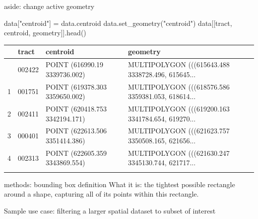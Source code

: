 \documentclass[
  ignorenonframetext,
]{beamer}
\newenvironment{Shaded}{\begin{snugshade}}{\end{snugshade}}
\newcommand{\NormalTok}[1]{\textcolor[rgb]{0.00,0.23,0.31}{#1}}
\newcommand{\OperatorTok}[1]{\textcolor[rgb]{0.37,0.37,0.37}{#1}}
\newcommand{\StringTok}[1]{\textcolor[rgb]{0.13,0.47,0.30}{#1}}
\begin{document}
\begin{frame}[fragile]{aside: change active geometry}
\label{aside-change-active-geometry}
\scriptsize

\begin{Shaded}
\begin{Highlighting}[]
\NormalTok{data[}\StringTok{"centroid"}\NormalTok{] }\OperatorTok{=}\NormalTok{ data.centroid}
\NormalTok{data.set\_geometry(}\StringTok{"centroid"}\NormalTok{)}
\NormalTok{data[[}\StringTok{\textquotesingle{}tract\textquotesingle{}}\NormalTok{, }\StringTok{\textquotesingle{}centroid\textquotesingle{}}\NormalTok{, }\StringTok{\textquotesingle{}geometry\textquotesingle{}}\NormalTok{]].head()}
\end{Highlighting}
\end{Shaded}

\begin{longtable}[]{@{}llll@{}}
\toprule\noalign{}
& tract & centroid & geometry \\
\midrule\noalign{}
\endhead
0 & 002422 & POINT (616990.19 3339736.002) & MULTIPOLYGON (((615643.488
3338728.496, 615645... \\
1 & 001751 & POINT (619378.303 3359650.002) & MULTIPOLYGON (((618576.586
3359381.053, 618614... \\
2 & 002411 & POINT (620418.753 3342194.171) & MULTIPOLYGON (((619200.163
3341784.654, 619270... \\
3 & 000401 & POINT (622613.506 3351414.386) & MULTIPOLYGON (((621623.757
3350508.165, 621656... \\
4 & 002313 & POINT (622605.359 3343869.554) & MULTIPOLYGON (((621630.247
3345130.744, 621717... \\
\bottomrule\noalign{}
\end{longtable}

\normalsize
\end{frame}

\begin{frame}{methods: bounding box definition}
\label{methods-bounding-box-definition}
What it is: the tightest possible rectangle around a shape, capturing
all of its points within this rectangle.

Sample use case: filtering a larger spatial dataset to subset of
interest
\end{frame}
\end{document}

